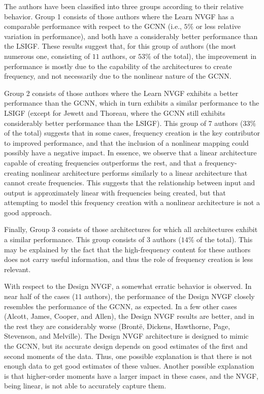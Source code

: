The authors have been classified into three groups according to their relative behavior. Group 1 consists of those authors where the Learn NVGF has a comparable performance with respect to the GCNN (i.e., $5\%$ or less relative variation in performance), and both have a considerably better performance than the LSIGF. These results suggest that, for this group of authors (the most numerous one, consisting of $11$ authors, or $53\%$ of the total), the improvement in performance is mostly due to the capability of the architectures to create frequency, and not necessarily due to the nonlinear nature of the GCNN.

Group 2 consists of those authors where the Learn NVGF exhibits a better performance than the GCNN, which in turn exhibits a similar performance to the LSIGF (except for Jewett and Thoreau, where the GCNN still exhibits considerably better performance than the LSIGF). This group of 7 authors ($33\%$ of the total) suggests that in some cases, frequency creation is the key contributor to improved performance, and that the inclusion of a nonlinear mapping could possibly have a negative impact. In essence, we observe that a linear architecture capable of creating frequencies outperforms the rest, and that a frequency-creating nonlinear architecture performs similarly to a linear architecture that cannot create frequencies. This suggests that the relationship between input and output is approximately linear with frequencies being created, but that attempting to model this frequency creation with a nonlinear architecture is not a good approach.

Finally, Group 3 consists of those architectures for which all architectures exhibit a similar performance. This group consists of $3$ authors ($14\%$ of the total). This may be explained by the fact that the high-frequency content for these authors does not carry useful information, and thus the role of frequency creation is less relevant.

With respect to the Design NVGF, a somewhat erratic behavior is observed. In near half of the cases ($11$ authors), the performance of the Design NVGF closely resembles the performance of the GCNN, as expected. In a few other cases (Alcott, James, Cooper, and Allen), the Design NVGF results are better, and in the rest they are considerably worse (Bront\"{e}, Dickens, Hawthorne, Page, Stevenson, and Melville). The Design NVGF architecture is designed to mimic the GCNN, but its accurate design depends on good estimates of the first and second moments of the data. Thus, one possible explanation is that there is not enough data to get good estimates of these values. Another possible explanation is that higher-order moments have a larger impact in these cases, and the NVGF, being linear, is not able to accurately capture them.

